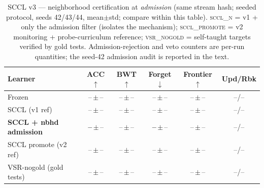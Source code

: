 \documentclass[10pt,conference]{IEEEtran}
\newcommand{\vthreefrozenaccmean}{--}\newcommand{\vthreefrozenaccstd}{--}\newcommand{\vthreefrozenbwtmean}{--}\newcommand{\vthreefrozenbwtstd}{--}%
\newcommand{\vthreefrozenforgetmean}{--}\newcommand{\vthreefrozenforgetstd}{--}\newcommand{\vthreefrozenfrontiermean}{--}\newcommand{\vthreefrozenfrontierstd}{--}%
\newcommand{\vthreefrozenupdatesmean}{--}\newcommand{\vthreefrozenrollbacksmean}{--}%
\newcommand{\vthreescclaccmean}{--}\newcommand{\vthreescclaccstd}{--}\newcommand{\vthreescclbwtmean}{--}\newcommand{\vthreescclbwtstd}{--}%
\newcommand{\vthreescclforgetmean}{--}\newcommand{\vthreescclforgetstd}{--}\newcommand{\vthreescclfrontiermean}{--}\newcommand{\vthreescclfrontierstd}{--}%
\newcommand{\vthreescclupdatesmean}{--}\newcommand{\vthreescclrollbacksmean}{--}%
\newcommand{\vthreescclnaccmean}{--}\newcommand{\vthreescclnaccstd}{--}\newcommand{\vthreescclnbwtmean}{--}\newcommand{\vthreescclnbwtstd}{--}%
\newcommand{\vthreescclnforgetmean}{--}\newcommand{\vthreescclnforgetstd}{--}\newcommand{\vthreescclnfrontiermean}{--}\newcommand{\vthreescclnfrontierstd}{--}%
\newcommand{\vthreescclnupdatesmean}{--}\newcommand{\vthreescclnrollbacksmean}{--}%
\newcommand{\vthreescclpromoteaccmean}{--}\newcommand{\vthreescclpromoteaccstd}{--}\newcommand{\vthreescclpromotebwtmean}{--}\newcommand{\vthreescclpromotebwtstd}{--}%
\newcommand{\vthreescclpromoteforgetmean}{--}\newcommand{\vthreescclpromoteforgetstd}{--}\newcommand{\vthreescclpromotefrontiermean}{--}\newcommand{\vthreescclpromotefrontierstd}{--}%
\newcommand{\vthreescclpromoteupdatesmean}{--}\newcommand{\vthreescclpromoterollbacksmean}{--}%
\newcommand{\vthreevsrnogoldaccmean}{--}\newcommand{\vthreevsrnogoldaccstd}{--}\newcommand{\vthreevsrnogoldbwtmean}{--}\newcommand{\vthreevsrnogoldbwtstd}{--}%
\newcommand{\vthreevsrnogoldforgetmean}{--}\newcommand{\vthreevsrnogoldforgetstd}{--}\newcommand{\vthreevsrnogoldfrontiermean}{--}\newcommand{\vthreevsrnogoldfrontierstd}{--}%
\newcommand{\vthreevsrnogoldupdatesmean}{--}\newcommand{\vthreevsrnogoldrollbacksmean}{--}}
\begin{document}
\begin{table}[htbp]
\centering
\caption{SCCL v3 — neighborhood certification at \emph{admission} (same stream hash; seeded protocol, seeds 42/43/44, mean$\pm$std; compare within this table). \textsc{sccl\_n} = v1 + only the admission filter (isolates the mechanism); \textsc{sccl\_promote} = v2 monitoring + probe-curriculum reference; \textsc{vsr\_nogold} = self-taught targets verified by gold tests. Admission-rejection and veto counters are per-run quantities; the seed-42 admission audit is reported in the text.}
\label{tab:v3}
\begin{tabular}{lccccc}
\toprule
Learner & ACC$\uparrow$ & BWT$\uparrow$ & Forget$\downarrow$ & Frontier$\uparrow$ & Upd/Rbk \\
\midrule
Frozen              & \vthreefrozenaccmean\,$\pm$\,\vthreefrozenaccstd & \vthreefrozenbwtmean\,$\pm$\,\vthreefrozenbwtstd & \vthreefrozenforgetmean\,$\pm$\,\vthreefrozenforgetstd & \vthreefrozenfrontiermean\,$\pm$\,\vthreefrozenfrontierstd & \vthreefrozenupdatesmean/\vthreefrozenrollbacksmean \\
SCCL (v1 ref)       & \vthreescclaccmean\,$\pm$\,\vthreescclaccstd & \vthreescclbwtmean\,$\pm$\,\vthreescclbwtstd & \vthreescclforgetmean\,$\pm$\,\vthreescclforgetstd & \vthreescclfrontiermean\,$\pm$\,\vthreescclfrontierstd & \vthreescclupdatesmean/\vthreescclrollbacksmean \\
\textbf{SCCL + nbhd admission} & \textbf{\vthreescclnaccmean}\,$\pm$\,\vthreescclnaccstd & \vthreescclnbwtmean\,$\pm$\,\vthreescclnbwtstd & \textbf{\vthreescclnforgetmean}\,$\pm$\,\vthreescclnforgetstd & \vthreescclnfrontiermean\,$\pm$\,\vthreescclnfrontierstd & \vthreescclnupdatesmean/\vthreescclnrollbacksmean \\
SCCL promote (v2 ref) & \vthreescclpromoteaccmean\,$\pm$\,\vthreescclpromoteaccstd & \vthreescclpromotebwtmean\,$\pm$\,\vthreescclpromotebwtstd & \vthreescclpromoteforgetmean\,$\pm$\,\vthreescclpromoteforgetstd & \vthreescclpromotefrontiermean\,$\pm$\,\vthreescclpromotefrontierstd & \vthreescclpromoteupdatesmean/\vthreescclpromoterollbacksmean \\
VSR-nogold (gold tests) & \vthreevsrnogoldaccmean\,$\pm$\,\vthreevsrnogoldaccstd & \vthreevsrnogoldbwtmean\,$\pm$\,\vthreevsrnogoldbwtstd & \vthreevsrnogoldforgetmean\,$\pm$\,\vthreevsrnogoldforgetstd & \vthreevsrnogoldfrontiermean\,$\pm$\,\vthreevsrnogoldfrontierstd & \vthreevsrnogoldupdatesmean/\vthreevsrnogoldrollbacksmean \\
\bottomrule
\end{tabular}
\end{table}
\end{document}
